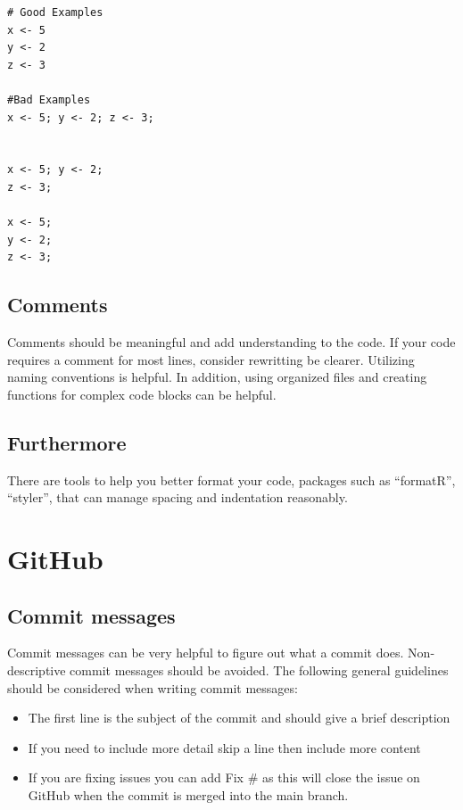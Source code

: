 \documentclass[
]{book}
\providecommand{\tightlist}{%
  \setlength{\itemsep}{0pt}\setlength{\parskip}{0pt}}
\begin{document}
\begin{verbatim}
# Good Examples
x <- 5
y <- 2
z <- 3

#Bad Examples
x <- 5; y <- 2; z <- 3;


x <- 5; y <- 2; 
z <- 3;

x <- 5; 
y <- 2; 
z <- 3;
\end{verbatim}

\hypertarget{comments}{%
\section{Comments}\label{comments}}

Comments should be meaningful and add understanding to the code.
If your code requires a comment for most lines, consider
rewritting be clearer. Utilizing naming conventions is helpful.
In addition, using organized files and creating functions for
complex code blocks can be helpful.

\hypertarget{furthermore}{%
\section{Furthermore}\label{furthermore}}

There are tools to help you better format your code, packages such as
``formatR'', ``styler'', that can manage spacing and indentation
reasonably.

\hypertarget{github}{%
\chapter{GitHub}\label{github}}

\hypertarget{commit-messages}{%
\section{Commit messages}\label{commit-messages}}

Commit messages can be very helpful to figure out what a commit does. Non-descriptive commit messages should be avoided. The following general guidelines should be considered when writing commit messages:

\begin{itemize}
\tightlist
\item
  The first line is the subject of the commit and should give a brief description
\item
  If you need to include more detail skip a line then include more content
\item
  If you are fixing issues you can add Fix \# as this will close the issue on GitHub when the commit is merged into the main branch.
\end{itemize}
\end{document}
